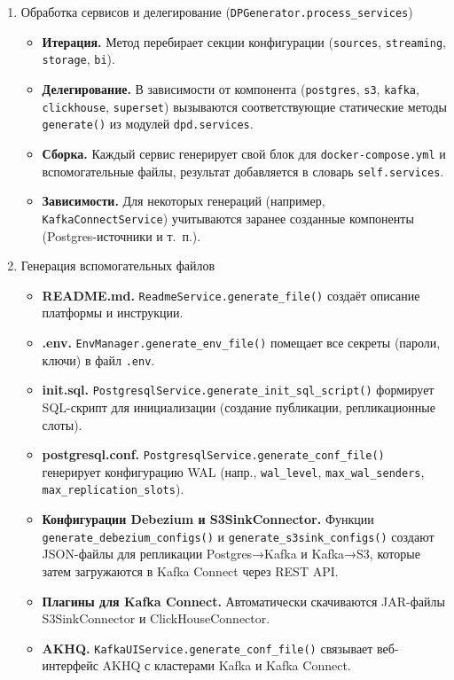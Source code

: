 \begin{enumerate}[1.]
    \item Обработка сервисов и делегирование (\texttt{DPGenerator.process\_services})
          \begin{itemize}
              \item \textbf{Итерация.} Метод перебирает секции конфигурации (\texttt{sources}, \texttt{streaming}, \texttt{storage}, \texttt{bi}).
              \item \textbf{Делегирование.} В зависимости от компонента (\texttt{postgres}, \texttt{s3}, \texttt{kafka}, \texttt{clickhouse}, \texttt{superset}) вызываются соответствующие статические методы \texttt{generate()} из модулей \texttt{dpd.services}.
              \item \textbf{Сборка.} Каждый сервис генерирует свой блок для \texttt{docker-compose.yml} и вспомогательные файлы, результат добавляется в словарь \texttt{self.services}.
              \item \textbf{Зависимости.} Для некоторых генераций (например, \texttt{KafkaConnectService}) учитываются заранее созданные компоненты (Postgres-источники и т.~п.).
          \end{itemize}

    \item Генерация вспомогательных файлов
          \begin{itemize}
              \item \textbf{README.md.} \texttt{ReadmeService.generate\_file()} создаёт описание платформы и инструкции.
              \item \textbf{.env.} \texttt{EnvManager.generate\_env\_file()} помещает все секреты (пароли, ключи) в файл \texttt{.env}.
              \item \textbf{init.sql.} \texttt{PostgresqlService.generate\_init\_sql\_script()} формирует SQL-скрипт для инициализации (создание публикации, репликационные слоты).
              \item \textbf{postgresql.conf.} \texttt{PostgresqlService.generate\_conf\_file()} генерирует конфигурацию WAL (напр., \texttt{wal\_level}, \texttt{max\_wal\_senders}, \texttt{max\_replication\_slots}).
              \item \textbf{Конфигурации Debezium и S3SinkConnector.} Функции \texttt{generate\_debezium\_configs()} и \texttt{generate\_s3sink\_configs()} создают JSON-файлы для репликации Postgres→Kafka и Kafka→S3, которые затем загружаются в Kafka Connect через REST API.
              \item \textbf{Плагины для Kafka Connect.} Автоматически скачиваются JAR-файлы S3SinkConnector и ClickHouseConnector.
              \item \textbf{AKHQ.} \texttt{KafkaUIService.generate\_conf\_file()} связывает веб-интерфейс AKHQ с кластерами Kafka и Kafka Connect.
          \end{itemize}


\end{enumerate}

